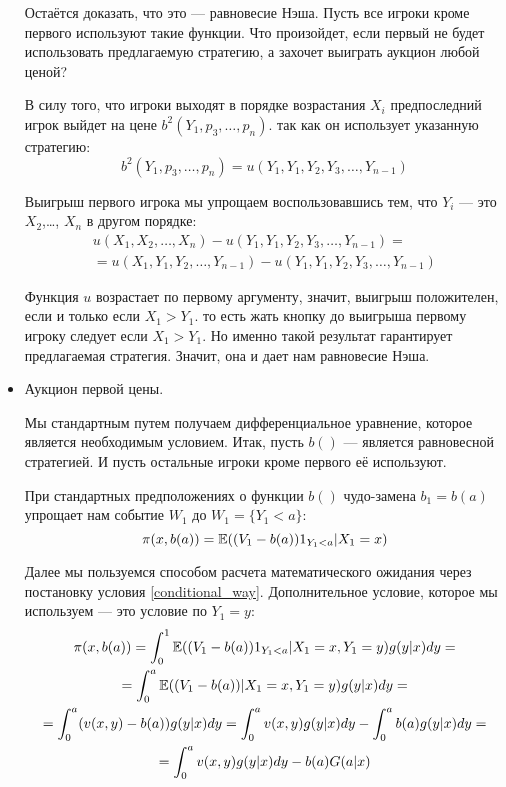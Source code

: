 \begin{itemize}
Остаётся доказать, что это — равновесие Нэша. Пусть все игроки кроме первого используют такие функции. Что произойдет, если первый не будет использовать предлагаемую стратегию, а захочет выиграть аукцион любой ценой?

В силу того, что игроки выходят в порядке возрастания $ X_{i} $ предпоследний игрок выйдет на цене $ b^{2}(Y_{1},p_{3},\ldots,p_{n}) $. так как он использует указанную стратегию:
\begin{equation}
b^{2}(Y_{1},p_{3},\ldots,p_{n}) =u(Y_{1},Y_{1},Y_{2},Y_{3},\ldots,Y_{n-1})
\end{equation}

Выигрыш первого игрока мы упрощаем воспользовавшись тем, что $ Y_{i} $ — это $ X_{2} $,\ldots, $ X_{n} $ в другом порядке:
\begin{multline}
u(X_{1},X_{2},\ldots,X_{n})-u(Y_{1},Y_{1},Y_{2},Y_{3},\ldots,Y_{n-1})=\\
=u(X_{1},Y_{1},Y_{2},\ldots,Y_{n-1})-u(Y_{1},Y_{1},Y_{2},Y_{3},\ldots,Y_{n-1})
\end{multline}

Функция $ u $ возрастает по первому аргументу, значит, выигрыш положителен, если и только если $ X_{1}>Y_{1} $. то есть жать кнопку до выигрыша первому игроку следует если $ X_{1}>Y_{1} $. Но именно такой результат гарантирует предлагаемая стратегия. Значит, она и дает нам равновесие Нэша.


\item Аукцион первой цены.

Мы стандартным путем получаем дифференциальное уравнение, которое является необходимым условием. Итак, пусть $ b() $ — является равновесной стратегией. И пусть остальные игроки кроме первого её используют.

При стандартных предположениях о функции $ b() $ чудо-замена $ b_{1}=b(a) $ упрощает нам событие $ W_{1} $ до $ W_{1}=\{Y_{1}<a\} $:
\begin{equation}
\pi(x,b(a))=\mathbb{E}((V_{1}-b(a))1_{Y_{1}<a}|X_{1}=x)
\end{equation}

Далее мы пользуемся способом расчета математического ожидания через постановку условия \ref{conditional_way}. Дополнительное условие, которое мы используем — это условие по $ Y_{1}=y $:
\begin{multline}
\pi(x,b(a))=\int_{0}^{1}\mathbb{E}((V_{1}-b(a))1_{Y_{1}<a}|X_{1}=x,Y_{1}=y)g(y|x)dy=\\
=\int_{0}^{a}\mathbb{E}((V_{1}-b(a))|X_{1}=x,Y_{1}=y)g(y|x)dy=\\
=\int_{0}^{a}(v(x,y)-b(a))g(y|x)dy=\int_{0}^{a}v(x,y)g(y|x)dy-\int_{0}^{a}b(a)g(y|x)dy=\\
=\int_{0}^{a}v(x,y)g(y|x)dy-b(a)G(a|x)
\end{multline}


\end{itemize}
